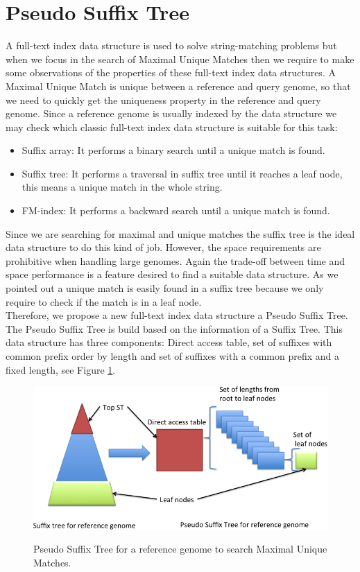 \documentclass[runningheads,a4paper]{llncs}
\begin{document}
\section{Pseudo Suffix Tree}
A full-text index data structure is used to solve string-matching problems but when we focus in the search of Maximal Unique Matches then we require to make some observations of the properties of these full-text index data structures. A Maximal Unique Match is unique between a reference and query genome, so that we need to quickly get the uniqueness property in the reference and query genome. Since a reference genome is usually indexed by the data structure we may check which classic full-text index data structure is suitable for this task:
\begin{itemize}
  \item Suffix array: It performs a binary search until a unique match is found.
  \item Suffix tree: It performs a traversal in suffix tree until it reaches a leaf node, this means a unique match in the whole string.
  \item FM-index: It performs a backward search until a unique match is found.
\end{itemize}
Since we are searching for maximal and unique matches the suffix tree is the ideal data structure to do this kind of job. However, the space requirements are prohibitive when handling large genomes. Again the trade-off between time and space performance is a feature desired to find a suitable data structure. As we pointed out a unique match is easily found in a suffix tree because we only require to check if the match is in a leaf node.\\
Therefore, we propose a new full-text index data structure a Pseudo Suffix Tree. The Pseudo Suffix Tree is build based on the information of a Suffix Tree. This data structure has three components: Direct access table, set of suffixes with common prefix order by length and set of suffixes with a common prefix and a fixed length, see Figure \ref{fig:pseudo}.
\begin{figure}
\centering
\includegraphics[scale=0.5]{pseudoST.png}
\label{fig:pseudo}
\caption{Pseudo Suffix Tree for a reference genome to search Maximal Unique Matches.}
\end{figure}
\end{document}
